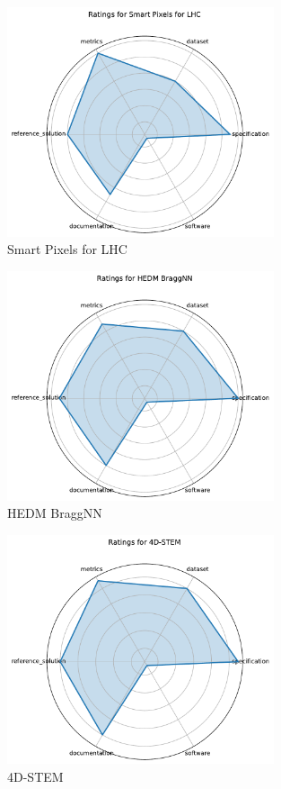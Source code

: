 \documentclass{article}
\begin{document}
\begin{figure}[h!]
  \centering
  \includegraphics[width=0.7\textwidth]{Smart Pixels for LHC_radar.pdf}
  \caption{Smart Pixels for LHC}
\end{figure}

\begin{figure}[h!]
  \centering
  \includegraphics[width=0.7\textwidth]{HEDM BraggNN_radar.pdf}
  \caption{HEDM BraggNN}
\end{figure}

\begin{figure}[h!]
  \centering
  \includegraphics[width=0.7\textwidth]{4D-STEM_radar.pdf}
  \caption{4D-STEM}
\end{figure}
\end{document}
